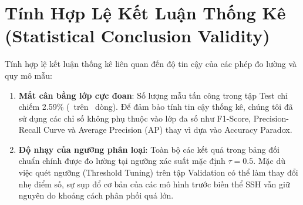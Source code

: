 \section{Tính Hợp Lệ Kết Luận Thống Kê (Statistical Conclusion Validity)}

Tính hợp lệ kết luận thống kê liên quan đến độ tin cậy của các phép đo lường và quy mô mẫu:
\begin{enumerate}
    \item \textbf{Mất cân bằng lớp cực đoan}: Số lượng mẫu tấn công trong tập Test chỉ chiếm 2.59\% (\DataTestAttack\ trên \DataTestRows\ dòng). Để đảm bảo tính tin cậy thống kê, chúng tôi đã sử dụng các chỉ số không phụ thuộc vào lớp đa số như F1-Score, Precision-Recall Curve và Average Precision (AP) thay vì dựa vào Accuracy Paradox.
    \item \textbf{Độ nhạy của ngưỡng phân loại}: Toàn bộ các kết quả trong bảng đối chuẩn chính được đo lường tại ngưỡng xác suất mặc định $\tau = 0.5$. Mặc dù việc quét ngưỡng (Threshold Tuning) trên tập Validation có thể làm thay đổi nhẹ điểm số, sự sụp đổ cơ bản của các mô hình trước biến thể SSH vẫn giữ nguyên do khoảng cách phân phối quá lớn.
\end{enumerate}
